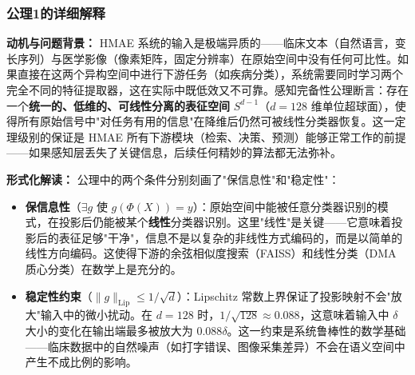 \documentclass[11pt,a4paper]{ctexart}
\theoremstyle{remark}
\begin{document}
\subsubsection{公理1的详细解释}

\textbf{动机与问题背景：} HMAE 系统的输入是极端异质的——临床文本（自然语言，变长序列）与医学影像（像素矩阵，固定分辨率）在原始空间中没有任何可比性。如果直接在这两个异构空间中进行下游任务（如疾病分类），系统需要同时学习两个完全不同的特征提取器，这在实际中既低效又不可靠。感知完备性公理断言：存在一个\textbf{统一的、低维的、可线性分离的表征空间} $S^{d-1}$（$d=128$ 维单位超球面），使得所有原始信号中"对任务有用的信息"在降维后仍然可被线性分类器恢复。这一定理级别的保证是 HMAE 所有下游模块（检索、决策、预测）能够正常工作的前提——如果感知层丢失了关键信息，后续任何精妙的算法都无法弥补。

\textbf{形式化解读：} 公理中的两个条件分别刻画了"保信息性"和"稳定性"：
\begin{itemize}[nosep]
\item \textbf{保信息性}（$\exists g$ 使 $g(\Phi(X)) = y$）：原始空间中能被任意分类器识别的模式，在投影后仍能被某个\textbf{线性}分类器识别。这里"线性"是关键——它意味着投影后的表征足够"干净"，信息不是以复杂的非线性方式编码的，而是以简单的线性方向编码。这使得下游的余弦相似度搜索（FAISS）和线性分类（DMA 质心分类）在数学上是充分的。
\item \textbf{稳定性约束}（$\|g\|_{\text{Lip}} \leq 1/\sqrt{d}$）：Lipschitz 常数上界保证了投影映射不会"放大"输入中的微小扰动。在 $d=128$ 时，$1/\sqrt{128} \approx 0.088$，这意味着输入中 $\delta$ 大小的变化在输出端最多被放大为 $0.088\delta$。这一约束是系统鲁棒性的数学基础——临床数据中的自然噪声（如打字错误、图像采集差异）不会在语义空间中产生不成比例的影响。
\end{itemize}
\end{document}
